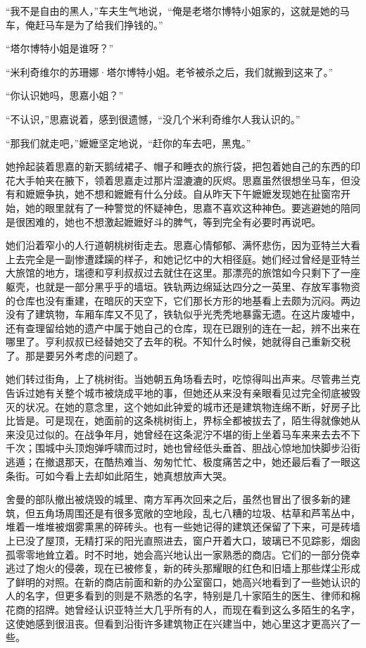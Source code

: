 \par “我不是自由的黑人，”车夫生气地说，“俺是老塔尔博特小姐家的，这就是她的马车，俺赶马车是为了给我们挣钱的。”
\par “塔尔博特小姐是谁呀？”
\par “米利奇维尔的苏珊娜·塔尔博特小姐。老爷被杀之后，我们就搬到这来了。”
\par “你认识她吗，思嘉小姐？”
\par “不认识，”思嘉说着，感到很遗憾，“没几个米利奇维尔人我认识的。”
\par “那我们就走吧，”嬷嬷坚定地说，“赶你的车去吧，黑鬼。”
\par 她拎起装着思嘉的新天鹅绒裙子、帽子和睡衣的旅行袋，把包着她自己的东西的印花大手帕夹在腋下，领着思嘉走过那片湿漉漉的灰烬。思嘉虽然很想坐马车，但没有和嬷嬷争执，她不想和嬷嬷有什么分歧。自从昨天下午嬷嬷发现她在扯窗帘开始，她的眼里就有了一种警觉的怀疑神色，思嘉不喜欢这种神色。要逃避她的陪同是很困难的，她也不想激起嬷嬷好斗的脾气，等到完全有必要时再说吧。
\par 她们沿着窄小的人行道朝桃树街走去。思嘉心情郁郁、满怀悲伤，因为亚特兰大看上去完全是一副惨遭蹂躏的样子，和她记忆中的大相径庭。她们经过曾经是亚特兰大旅馆的地方，瑞德和亨利叔叔过去就住在这里。那漂亮的旅馆如今只剩下了一座躯壳，也就是一部分黑乎乎的墙垣。铁轨两边绵延达四分之一英里、存放军事物资的仓库也没有重建，在暗灰的天空下，它们那长方形的地基看上去颇为沉闷。两边没有了建筑物，车厢车库又不见了，铁轨似乎光秃秃地暴露无遗。在这片废墟中，还有查理留给她的遗产中属于她自己的仓库，现在已跟别的连在一起，辨不出来在哪里了。亨利叔叔已经替她交了去年的税。不知什么时候，她就得自己重新交税了。那是要另外考虑的问题了。
\par 她们转过街角，上了桃树街。当她朝五角场看去时，吃惊得叫出声来。尽管弗兰克告诉过她有关整个城市被烧成平地的事，但她还从来没有亲眼看见过完全彻底被毁灭的状况。在她的意念里，这个她如此钟爱的城市还是建筑物连绵不断，好房子比比皆是。可是现在，她面前的这条桃树街上，界标全都被拔去了，陌生得就像她从来没见过似的。在战争年月，她曾经在这条泥泞不堪的街上坐着马车来来去去不下千次；围城中头顶炮弹呼啸而过时，她也曾经低头垂首、胆战心惊地加快脚步沿街逃遁；在撤退那天，在酷热难当、匆匆忙忙、极度痛苦之中，她还最后看了一眼这条街。可如今看上去却如此陌生，她真想放声大哭。
\par 舍曼的部队撤出被烧毁的城里、南方军再次回来之后，虽然也冒出了很多新的建筑，但五角场周围还是有很多宽敞的空地段，乱七八糟的垃圾、枯草和芦苇丛中，堆着一堆堆被烟雾熏黑的碎砖头。也有一些她记得的建筑还保留了下来，可是砖墙上已没了屋顶，无精打采的阳光直照进去，窗户开着大口，玻璃已不见踪影，烟囱孤零零地耸立着。时不时地，她会高兴地认出一家熟悉的商店。它们的一部分侥幸逃过了炮火的侵袭，现在已被修复，新的砖头那耀眼的红色和旧墙上那些煤尘形成了鲜明的对照。在新的商店前面和新的办公室窗口，她高兴地看到了一些她认识的人的名字，但更多看到的则是不熟悉的名字，特别是几十家陌生的医生、律师和棉花商的招牌。她曾经认识亚特兰大几乎所有的人，而现在看到这么多陌生的名字，这使她感到很沮丧。但看到沿街许多建筑物正在兴建当中，她心里这才更高兴了一些。
